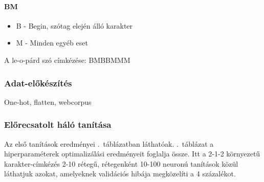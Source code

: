 \documentclass[a4paper, magyar]{article}
\begin{document}
\paragraph{BM}
\begin{itemize}
	\item B - Begin, szótag elején álló karakter
	\item M - Minden egyéb eset
\end{itemize}
A
{\selectfont
	le-o-párd%
}
szó címkézése:
{\selectfont
	BMBBMMM%
}
\subsubsection{Adat-előkészítés}
One-hot, flatten, webcorpus
\subsubsection{Előrecsatolt háló tanítása}
Az első tanítások eredményei .~táblázatban láthatóak. .~táblázat a hiperparaméterek optimalizálási eredményeit foglalja össze. Itt a 2-1-2 környezetű karakter-címkézés 2-10 rétegű, rétegenként 10-100 neuronú tanítások közül láthatjuk azokat, amelyeknek validációs hibája megközelíti a 4 százalékot.
\end{document}
